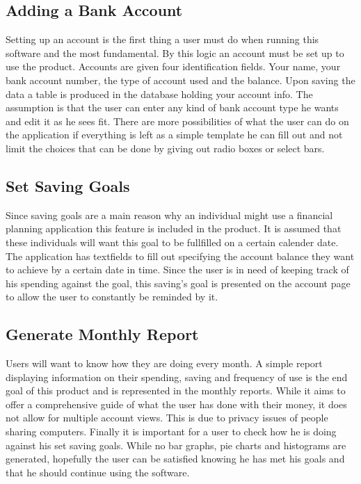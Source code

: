 \documentclass[12pt]{article}
\begin{document}
\subsection{Adding a Bank Account}
	Setting up an account is the first thing a user must do when running this software and the most fundamental. By this logic an account must be set up to use the product. Accounts are given four identification fields. Your name, your bank account number, the type of account used and the balance. Upon saving the data a table is produced in the database holding your account info. The assumption is that the user can enter any kind of bank account type he wants and edit it as he sees fit. There are more possibilities of what the user can do on the application if everything is left as a simple template he can fill out and not limit the choices that can be done by giving out radio boxes or select bars.
\subsection{Set Saving Goals}
	Since saving goals are a main reason why an individual might use a financial planning application this feature is included in the product. It is assumed that these individuals will want this goal to be fullfilled on a certain calender date. The application has textfields to fill out specifying the account balance they want to achieve by a certain date in time. Since the user is in need of keeping track of his spending against the goal, this saving's goal is presented on the account page to allow the user to constantly be reminded by it.
	
\subsection{Generate Monthly Report}
	Users will want to know how they are doing every month. A simple report displaying information on their spending, saving and frequency of use is the end goal of this product and is represented in the monthly reports. While it aims to offer a comprehensive guide of what the user has done with their money, it does not allow for multiple account views. This is due to privacy issues of people sharing computers. Finally it is important for a user to check how he is doing against his set saving goals. While no bar graphs, pie charts and histograms are generated, hopefully the user can be satisfied knowing he has met his goals and that he should continue using the software.
	
\end{document}
